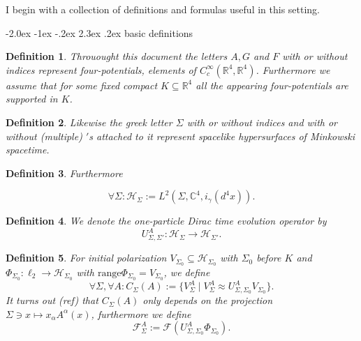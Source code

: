 \documentclass[oneside,reqno,12pt]{amsart}
\makeatletter
\newtheorem{Def}{Definition}[section]
\renewcommand\section{\@startsection {section}{1}{\z@}%
                                   {-2.0ex \@plus -1ex \@minus -.2ex}%
                                   {2.3ex \@plus.2ex}%
                                   {\normalfont\Large\bfseries}}
\makeatother
\begin{document}
I begin with a collection of definitions and formulas useful in this setting.

\section{basic definitions}
\begin{Def}
Throuought this document the letters \(A,G\) and \(F\) with or without indices represent four-potentials,  elements of \(C_c^\infty(\mathbb{R}^4, \mathbb{R}^4)\). Furthermore we assume that for some fixed compact \(K\subseteq \mathbb{R}^4\) all the appearing four-potentials are supported in \(K\).
\end{Def}
\begin{Def}
Likewise the greek letter \(\Sigma\) with or without indices and with or without (multiple) \('\)s attached to it represent spacelike hypersurfaces of Minkowski spacetime.
\end{Def}

\begin{Def}
Furthermore

\begin{equation}
\forall \Sigma: \mathcal{H}_\Sigma:= L^2(\Sigma, \mathbb{C}^4, i_\gamma(d^4x)).
\end{equation}
\end{Def}

\begin{Def}
We denote the one-particle Dirac time evolution operator by
\begin{equation}
U^A_{\Sigma, \Sigma'} : \mathcal{H}_\Sigma\rightarrow \mathcal{H}_{\Sigma'}.
\end{equation}
\end{Def}

\begin{Def}
For initial polarization \(V_{\Sigma_0}\subseteq \mathcal{H}_{\Sigma_0}\) with \(\Sigma_0\) before \(K\) and \(\Phi_{\Sigma_0}: \ell_2\rightarrow \mathcal{H}_{\Sigma_0}\) with \(\text{range}\Phi_{\Sigma_0}=V_{\Sigma_0}\), we define
\begin{equation}
\forall \Sigma, \forall A: C_{\Sigma}(A):=\{V_\Sigma^A\mid V_\Sigma^A \approx U^A_{\Sigma, \Sigma_0} V_{\Sigma_0}\}.
\end{equation}
It turns out (ref) that \(C_{\Sigma}(A)\) only depends on the projection \(\Sigma\ni x\mapsto x_\alpha A^\alpha(x)\), furthermore we define
\begin{equation}
\mathcal{F}_{\Sigma}^A:=\mathcal{F}( U_{\Sigma, \Sigma_0}^A\Phi_{\Sigma_0}).
\end{equation}
\end{Def}
\end{document}

